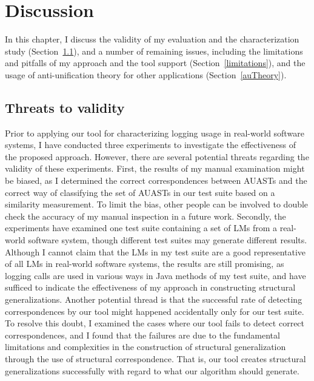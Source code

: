 \chapter{Discussion}  \label{diss}

In this chapter, I discuss the validity of my evaluation and the characterization study (Section~\ref{threads}), and a number of remaining issues, including the limitations and pitfalls of my approach and the tool support (Section~\ref{limitations}), and the usage of anti-unification theory for other applications (Section~\ref{auTheory}).

\section{Threats to validity}  \label{threads}
Prior to applying our tool for characterizing logging usage in real-world software systems, I have conducted three experiments to investigate the effectiveness of the proposed approach. However, there are several potential threats regarding the validity of these experiments. First, the results of my manual examination might be biased, as I determined the correct correspondences between AUASTs and the correct way of classifying the set of AUASTs in our test suite based on a similarity measurement. To limit the bias, other people can be involved to double check the accuracy of my manual inspection in a future work. Secondly, the experiments have examined one test suite containing a set of LMs from a real-world software system, though different test suites may generate different results. Although I cannot claim that the LMs in my test suite are a good representative of all LMs in real-world software systems, the results are still promising, as logging calls are used in various ways in Java methods of my test suite, and have sufficed to indicate the effectiveness of my approach in constructing structural generalizations. Another potential thread is that the successful rate of detecting correspondences by our tool might happened accidentally only for our test suite. To resolve this doubt, I examined the cases where our tool fails to detect correct correspondences, and I found that the failures are due to the fundamental limitations and complexities in the construction of structural generalization through the use of structural correspondence. That is, our tool creates structural generalizations successfully with regard to what our algorithm should generate.
